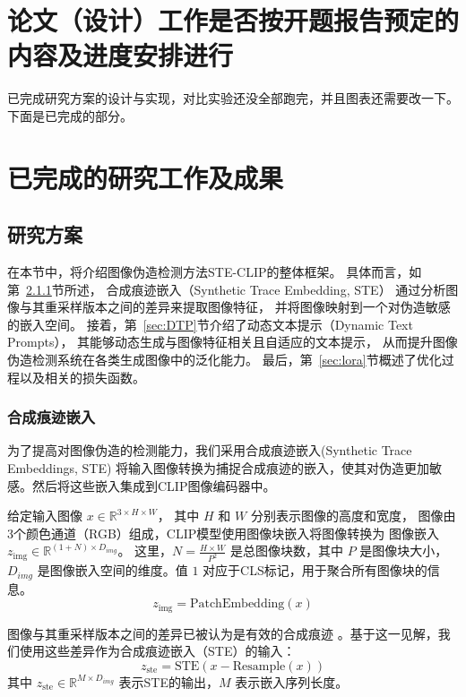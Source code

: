 


\section{论文（设计）工作是否按开题报告预定的内容及进度安排进行}

已完成研究方案的设计与实现，对比实验还没全部跑完，并且图表还需要改一下。下面是已完成的部分。

\section{已完成的研究工作及成果}

\subsection{研究方案}
在本节中，将介绍图像伪造检测方法STE-CLIP的整体框架。
具体而言，如第~\ref{sec:STE}节所述，
合成痕迹嵌入（Synthetic Trace Embedding, STE）
通过分析图像与其重采样版本之间的差异来提取图像特征，
并将图像映射到一个对伪造敏感的嵌入空间。
接着，第~\ref{sec:DTP}节介绍了动态文本提示（Dynamic Text Prompts），
其能够动态生成与图像特征相关且自适应的文本提示，
从而提升图像伪造检测系统在各类生成图像中的泛化能力。
最后，第~\ref{sec:lora}节概述了优化过程以及相关的损失函数。


\subsubsection{合成痕迹嵌入}
\label{sec:STE}
为了提高对图像伪造的检测能力，我们采用合成痕迹嵌入(Synthetic Trace Embeddings, STE)
将输入图像转换为捕捉合成痕迹的嵌入，使其对伪造更加敏感。然后将这些嵌入集成到CLIP图像编码器中。

给定输入图像 $ x \in \mathbb{R}^{3 \times H \times W} $，
其中 $ H $ 和 $ W $ 分别表示图像的高度和宽度，
图像由3个颜色通道（RGB）组成，CLIP模型使用图像块嵌入将图像转换为
图像嵌入 $ z_{\text{img}} \in \mathbb{R}^{(1 + N) \times D_{img}} $。
这里，$ N = \frac{H \times W}{P^2} $ 是总图像块数，其中 $ P $ 是图像块大小，
$ D_{img} $ 是图像嵌入空间的维度。值 $ 1 $ 对应于CLS标记，用于聚合所有图像块的信息。
\begin{equation}
    z_{\text{img}} = \text{PatchEmbedding}(x)
\end{equation}

图像与其重采样版本之间的差异已被认为是有效的合成痕迹 \cite{tan2024rethinking}。基于这一见解，我们使用这些差异作为合成痕迹嵌入（STE）的输入：
\begin{equation}
z_{\text{ste}} = \text{STE}\left( x - \text{Resample}(x)\right)
\end{equation}
其中 $ z_{\text{ste}} \in \mathbb{R}^{M \times D_{img}} $ 表示STE的输出，$ M $ 表示嵌入序列长度。

